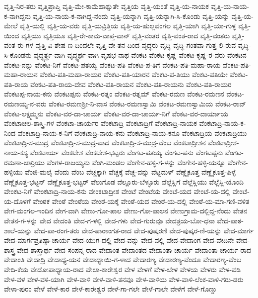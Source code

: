 ವೃತ್ತಿ-ನಿರ-ತರು
ವೃತ್ತಿಪ್ರಾಪ್ತಿ
ವೃತ್ತಿ-ಮೇ-ಕಾಮೆಹಾಶ್ನುತೇ
ವೃತ್ತಿಯ
ವೃತ್ತಿ-ಯಂತೆ
ವೃತ್ತಿ-ಯ-ನಾಯಕ
ವೃತ್ತಿ-ಯ-ನಾಯ-ಕ-ನಾಗಿದ್ದನು
ವೃತ್ತಿ-ಯ-ನಾಯ-ಕ-ನಾಗಿದ್ದ-ನೆಂದು
ವೃತ್ತಿ-ಯನ್ನಾಗಿ
ವೃತ್ತಿ-ಯನ್ನಾಗಿ-ಸಿ-ಕೊಂಡು
ವೃತ್ತಿ-ಯನ್ನು
ವೃತ್ತಿ-ಯ-ಮೇಲೆ
ವೃತ್ತಿ-ಯಲ್ಲಿ
ವೃತ್ತಿ-ಯ-ವರು
ವೃತ್ತಿ-ಯವ್ರಿತ್ತಿಯ
ವೃತ್ತಿ-ಯ-ಹುಲ್ಲವಂಗಲ
ವೃತ್ತಿ-ಯಾಗಿ
ವೃತ್ತಿ-ಯಾ-ಗುಳ್ಳ
ವೃತ್ತಿ-ಯಿಂದ
ವೃತ್ತಿಯು
ವೃತ್ತಿಯೂ
ವೃತ್ತಿ-ರೇ-ಕಾಮ-ವಾಪ್ತ-ವಾನ್
ವೃತ್ತಿ-ವಂತರ
ವೃತ್ತಿ-ವಂತ-ರಾದ
ವೃತ್ತಿ-ವಂತರು
ವೃತ್ತಿ-ವಂತ-ರು-ಗಳ
ವೃತ್ತಿ-ವಿ-ಶೇಷ-ಣ-ದಿಂದಲೇ
ವೃತ್ತಿ-ವೇ-ತನ-ದಿಂದ
ವೃದ್ಧರು
ವೃದ್ಧಿ
ವೃದ್ಧಿ-ಗಂತವಾ-ಗುತ್ತ-ಲಿ-ರುವ
ವೃದ್ಧಿ-ಸಿ-ಕೊಂಡನು
ವೃದ್ಧ್ಯರ್ತ್ಥ-ವಾಗಿ
ವೃದ್ಧ್ಯರ್ಥ-ವಾಗಿ
ವೃಷಭ-ನಾಥ
ವೆಂಕಟ
ವೆಂಕಟ-ಕೃಷ್ಣ
ವೆಂಕಟ-ಕೃಷ್ಣ-ರ-ವರು
ವೆಂಕಟನ
ವೆಂಕಟ-ನನ್ನು
ವೆಂಕಟ-ನಿಗೆ
ವೆಂಕಟ-ಪತಯ್ಯ
ವೆಂಕಟ-ಪತಿ
ವೆಂಕಟ-ಪ-ತಿಗೆ
ವೆಂಕಟ-ಪತಿ-ಮಹಾ-ರಾಯ
ವೆಂಕಟ-ಪತಿ-ಮಹಾ-ರಾಯನ
ವೆಂಕಟ-ಪತಿ-ಮಹಾ-ರಾಯರ
ವೆಂಕಟ-ಪತಿ-ಯಾರನ
ವೆಂಕಟ-ಪ-ತಿಯು
ವೆಂಕಟ-ಪತಿಯೇ
ವೆಂಕಟ-ಪತಿ-ರಾಯ
ವೆಂಕಟ-ಪತಿ-ರಾಯ-ದೇವ
ವೆಂಕಟ-ಪತಿ-ರಾಯನ
ವೆಂಕಟ-ಪತಿ-ರಾಯನು
ವೆಂಕಟ-ಪತಿ-ರಾಯರ
ವೆಂಕಟಪ್ಪ-ನಾಯ-ಕನು
ವೆಂಕಟಪ್ಪನು
ವೆಂಕಟ-ರತ್ನಂ
ವೆಂಕಟ-ರತ್ನಮ್
ವೆಂಕಟ-ರಮಣ
ವೆಂಕಟ-ರಮಣನ
ವೆಂಕಟ-ರಮಣಯ್ಯ-ನ-ವರು
ವೆಂಕಟ-ರಮಣಶ್ರೀ-ನಿ-ವಾಸ
ವೆಂಕಟ-ರಮಣಸ್ವಾಮಿ
ವೆಂಕಟ-ರಮಣಸ್ವಾಮಿಯ
ವೆಂಕಟ-ರಾವ್
ವೆಂಕಟ-ಲಕ್ಷ್ಮಮ್ಮನು
ವೆಂಕಟ-ವರ-ದಾ-ಚಾರ್ಯ
ವೆಂಕಟ-ವರ-ದಾ-ಚಾರ್ಯ-ನಿಗೆ
ವೆಂಕಟ-ವರ-ದಾರ್ಯಾಯ
ವೆಂಕಟಾಚಲ-ಶಾಸ್ತ್ರಿ-ಗಳ
ವೆಂಕಟಾ-ಚಾರ್ಯರ
ವೆಂಕಟಾದ್ರಿ
ವೆಂಕಟಾದ್ರಿಗೆ
ವೆಂಕಟಾದ್ರಿ-ನಾಯಕ
ವೆಂಕಟಾದ್ರಿ-ನಾಯ-ಕ-ನಿಂದ
ವೆಂಕಟಾದ್ರಿ-ನಾಯ-ಕ-ನಿಗೆ
ವೆಂಕಟಾದ್ರಿ-ನಾಯ-ಕನು
ವೆಂಕಟಾದ್ರಿ-ನಾಯ-ಕನೂ
ವೆಂಕಟಾದ್ರಿಯ
ವೆಂಕಟಾದ್ರಿಯು
ವೆಂಕಟಾದ್ರಿ-ಸ-ಮುದ್ರ
ವೆಂಕಟಾದ್ರಿ-ಸ-ಮುದ್ರ-ವಾದ
ವೆಂಕಟಾದ್ರಿ-ಸ-ಮುದ್ರ-ವೆಂಬ
ವೆಂಕಟಾದ್ರೀಶನ
ವೆಂಕಟಾದ್ರೀಶ-ನಾಯ-ಕಸ್ಯ
ವೆಂಕಟಾರ್ಯ
ವೆಂಕಟೇಶ
ವೆಂಕಟೇಶ-ಭಟ್ಟರು
ವೆಂಗಟ-ಪತಯ್ಯ
ವೆಂಗಟ-ಪನು
ವೆಂಗಟಪ್ಪನು
ವೆಂಗಟ-ರಮಣಾ-ಚಾರ್ರಿಯು
ವೆಂಗಳ-ರಾಜಯ್ಯನು
ವೆಂಗಿ-ಮಂಡಲ
ವೆಂಗೇನ-ಹಳ್ಳಿ-ಗ-ಳನ್ನು
ವೆಂಗೇನ-ಹಳ್ಳಿ-ಯನ್ನೂ
ವೆಂಗೇನ-ಹಳ್ಳಿಯು
ವೆಂಜಿ-ಮಲೈ
ವೆಂದು
ವೆಂಬ
ವೆಚ್ಚಕ್ಕಾಗಿ
ವೆಚ್ಚಕ್ಕೆ
ವೆಚ್ಚ-ವನ್ನು
ವೆಟ್ಟದುಳ್
ವೆಣ್ಣೈಕೂತ್ತ
ವೆಣ್ಣೈಕೂತ್ತ-ಪಿಳ್ಳೆ
ವೆಣ್ಣೈಕೂತ್ತ-ಭಟ್ಟನ್
ವೆಣ್ಣೈಕೂತ್ತ-ಭಟ್ಟರ್
ವೆಲುಗೊಡ
ವೆಲ್ಲೂರು-ಬೆಳ್ಳೂರು
ವೆಲ್ಲೆಸ್ಲಿಗೆ
ವೆಲ್ಲೆಸ್ಲಿಯು
ವೆಲ್ಲೆಸ್ಲಿ-ಯೊಂದಿ
ವೇಂಕಟ-ನಿಗೆ
ವೇಂಕಟಾದ್ರಿ-ನಾಯ-ಕನು
ವೇಂಕಟಾದ್ರೀಶ
ವೇಂಟೆ
ವೇಂಟೆಯ
ವೇಂಟೆ-ಯದ
ವೇಂಟೆ-ಯ-ದಲ್ಲಿ
ವೇಂಟೆ-ಯ-ದೊಳಗೆ
ವೇಂಠಕ
ವೇಂಠೆ
ವೇಂಠೆಯ
ವೇಂಠೆ-ಯಕ್ಕೆ
ವೇಂಠೆ-ಯದ
ವೇಂಠೆ-ಯ-ದಲ್ಲಿ
ವೇಂಠೆ-ಯ-ಮಾ-ಗಣಿ-ವಳಿತ
ವೇಗ-ಮಂಗಲ-ಇಂದಿನ
ವೇಗ-ವಾಗಿ
ವೇಣು-ಗೋ-ಪಾಲ
ವೇಣು-ಗೋ-ಪಾಲನ
ವೇಣುಗ್ರಾಮ-ದಲ್ಲಿದ್ದ-ನೆಂದು
ವೇತನ
ವೇತನ-ಗ-ಳನ್ನು
ವೇದ
ವೇದಂತಿ
ವೇದ-ಗ-ಳಲ್ಲಿ
ವೇದ-ಗಳು
ವೇದ-ಗುರುವೂ
ವೇದತ್ರಯ-ಬೋ-ಧನಾ
ವೇದ-ಪಾಠ-ಶಾಲೆ-ಯನ್ನು
ವೇದ-ಪಾ-ರಂಗ-ತರು
ವೇದ-ಪಾರಾಂಗತ-ರಾದ
ವೇದ-ಪುಷ್ಕರಣಿ
ವೇದ-ಪುಷ್ಕರ-ಣಿ-ಯನ್ನು
ವೇದ-ಮಾರ್ಗ
ವೇದ-ಮಾರ್ಗಪ್ರತಿಷ್ಠಾ-ಚಾರ್ಯ
ವೇದ-ಯುಗ-ದಲ್ಲಿ
ವೇದ-ವನ್ನು
ವೇದ-ವಲ್ಲಿ
ವೇದ-ವೇದಾಂಗ
ವೇದ-ವೇದಿನೇ
ವೇದ-ಶಾಸ್ತ್ರ
ವೇದ-ಶಾಸ್ತ್ರಾರ್ಥ
ವೇದ-ಸಂಪನ್ನ-ರಾದ
ವೇದಾಂತ
ವೇದಾಂತದ
ವೇದಾಂತಾ-ಚಾರ್ಯ
ವೇದಾಂತಾ-ಚಾರ್ಯ-ರಾದ
ವೇದಾಂತಿ
ವೇದಾದ್ರಿ
ವೇದಾಧ್ಯ-ಯನ
ವೇದಾಧ್ಯಾಯಿ-ಗ-ಳಾದ
ವೇದಾರಣ್ಯ
ವೇದಾರಣ್ಯ-ವೆಂದೂ
ವೇದಾರಣ್ಯ-ವೆಂಬ
ವೇದಿ-ಕೆಯ
ವೇದೋಪಾಧ್ಯಾಯ-ರಾದ
ವೇಲಾ-ಕಾರೇಶ್ವರ
ವೇಳ
ವೇಳಗೆ
ವೇಳ-ಬೇಳ
ವೇಳಯ
ವೇಳರು
ವೇಳ-ವಡಿ
ವೇಳ-ವಳ
ವೇಳ-ವಳಿ-ಯಾಗಿ
ವೇಳ-ವಾಳಿ
ವೇಳ-ವಾಳಿ-ತನವೂ
ವೇಳ-ವಾಳಿಯ
ವೇಳ-ವಾಳಿ-ಲೆಂಕ-ವಾಳಿ-ಗರು-ಡರು
ವೇಳಾ-ಪುರಂ
ವೇಳೆ
ವೇಳೆ-ಕಾರ
ವೇಳೆ-ಕಾರೇಶ್ವರ
ವೇಳೆ-ಗಾ-ಗಲೇ
ವೇಳೆ-ಗಾಲೇ
ವೇಳೆಗೆ
ವೇಳೆ-ಗೊಣ್ಡು
